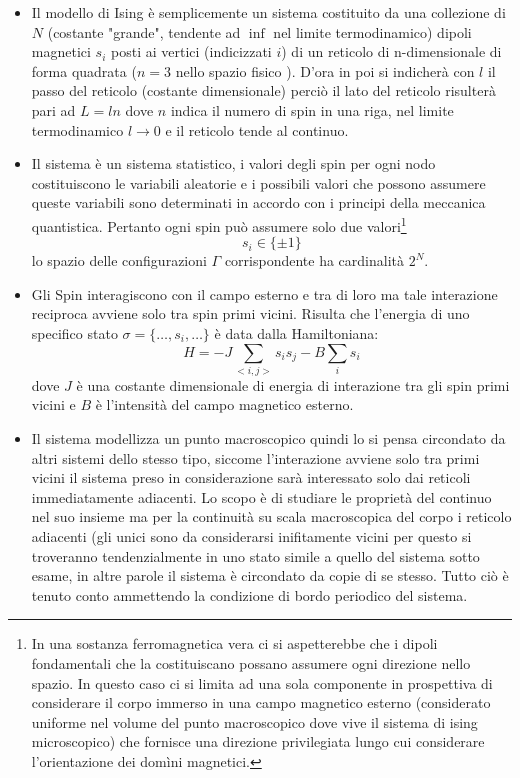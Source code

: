 \documentclass[11pt]{article}
\theoremstyle{plain}
\begin{document}
\begin{itemize}
\item Il modello di Ising è semplicemente un sistema costituito da una collezione di $N$ (costante "grande", tendente ad $\inf$ nel limite termodinamico) dipoli magnetici $s_{i}$ posti ai vertici (indicizzati $i$) di un reticolo di n-dimensionale di forma quadrata ($n=3$ nello spazio fisico ).
D'ora in poi si indicherà con $l$ il passo del reticolo (costante dimensionale) perciò il lato del reticolo risulterà pari ad $L = l n$ dove $n$ indica il numero di spin in una riga, nel limite termodinamico $l\rightarrow 0$ e il reticolo tende al continuo.

\item Il sistema è un sistema statistico, i valori degli spin per ogni nodo costituiscono le variabili aleatorie e i possibili valori che possono assumere queste variabili sono determinati in accordo con i principi della meccanica quantistica. Pertanto ogni spin può assumere solo due valori\footnote{ In una sostanza ferromagnetica vera ci si aspetterebbe che i dipoli fondamentali che la costituiscano possano assumere ogni direzione nello spazio. In questo caso ci si limita ad una sola componente in prospettiva di considerare il corpo immerso in una campo magnetico esterno (considerato uniforme nel volume del punto macroscopico dove vive il sistema di ising microscopico) che fornisce una direzione privilegiata lungo cui considerare l'orientazione dei domìni magnetici.} 
$$s_{i}\in \lbrace \pm 1 \rbrace$$
lo spazio delle configurazioni $\Gamma$ corrispondente ha cardinalità $2^{N}$.

\item Gli Spin interagiscono con il campo esterno e tra di loro ma tale interazione reciproca avviene solo tra spin primi vicini. Risulta che l'energia di uno specifico stato $\sigma =\lbrace\ldots , s_{i} ,\ldots \rbrace$ è data dalla Hamiltoniana:
\begin{equation}\label{Hamiltoniana}
H = - J \sum_{<i,j>}s_{i}s_{j}  -B\sum_i s_i
\end{equation}
dove $J$ è una costante dimensionale di energia di interazione tra gli spin primi vicini e $B$ è l'intensità del campo magnetico esterno.

\item Il sistema modellizza un punto macroscopico quindi lo si pensa circondato da altri sistemi dello stesso tipo, siccome l'interazione avviene solo tra primi vicini il sistema preso in considerazione sarà interessato solo dai reticoli immediatamente adiacenti.
Lo scopo è di studiare le proprietà del continuo nel suo insieme ma per la continuità su scala macroscopica del corpo i reticolo adiacenti (gli unici sono da considerarsi inifitamente vicini per questo si troveranno tendenzialmente in uno stato simile a quello del sistema sotto esame, in altre parole il sistema è circondato da copie di se stesso.
Tutto ciò è tenuto conto ammettendo la condizione di bordo periodico del sistema.
\begin{figure}


\end{figure}
\end{itemize}
\end{document}
